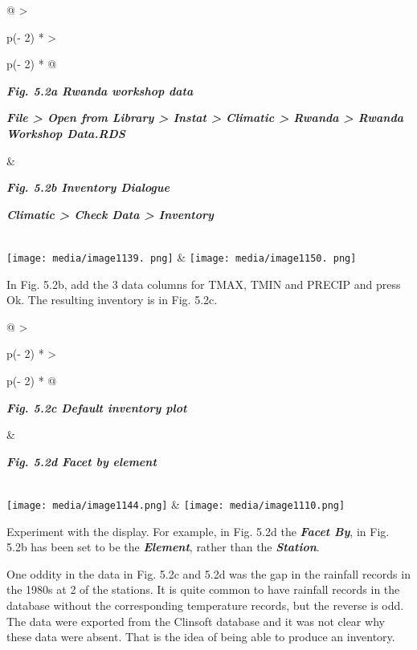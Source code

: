 \documentclass[
  letterpaper,
  DIV=11,
  numbers=noendperiod]{scrreprt}
\begin{document}
\begin{longtable}[]{@{}
  >{\raggedright\arraybackslash}p{(\columnwidth - 2\tabcolsep) * }
  >{\raggedright\arraybackslash}p{(\columnwidth - 2\tabcolsep) * }@{}}
\toprule\noalign{}
\begin{minipage}[b]{\linewidth}\raggedright
\textbf{\emph{Fig. 5.2a Rwanda workshop data}}

\textbf{\emph{File \textgreater{} Open from Library \textgreater{}
Instat \textgreater{} Climatic \textgreater{} Rwanda \textgreater{}
Rwanda Workshop Data.RDS}}
\end{minipage} & \begin{minipage}[b]{\linewidth}\raggedright
\textbf{\emph{Fig. 5.2b Inventory Dialogue}}

\textbf{\emph{Climatic \textgreater{} Check Data \textgreater{}
Inventory}}
\end{minipage} \\
\midrule\noalign{}
\endhead
\bottomrule\noalign{}
\endlastfoot
\texttt{[image: media/image1139. png]}
&
\texttt{[image: media/image1150. png]} \\
\end{longtable}

In Fig. 5.2b, add the 3 data columns for TMAX, TMIN and PRECIP and press
Ok. The resulting inventory is in Fig. 5.2c.

\begin{longtable}[]{@{}
  >{\raggedright\arraybackslash}p{(\columnwidth - 2\tabcolsep) * }
  >{\raggedright\arraybackslash}p{(\columnwidth - 2\tabcolsep) * }@{}}
\toprule\noalign{}
\begin{minipage}[b]{\linewidth}\raggedright
\textbf{\emph{Fig. 5.2c Default inventory plot}}
\end{minipage} & \begin{minipage}[b]{\linewidth}\raggedright
\textbf{\emph{Fig. 5.2d Facet by element}}
\end{minipage} \\
\midrule\noalign{}
\endhead
\bottomrule\noalign{}
\endlastfoot
\texttt{[image: media/image1144.png]}
&
\texttt{[image: media/image1110.png]} \\
\end{longtable}

Experiment with the display. For example, in Fig. 5.2d the
\textbf{\emph{Facet By}}, in Fig. 5.2b has been set to be the
\textbf{\emph{Element}}, rather than the \textbf{\emph{Station}}.

One oddity in the data in Fig. 5.2c and 5.2d was the gap in the rainfall
records in the 1980s at 2 of the stations. It is quite common to have
rainfall records in the database without the corresponding temperature
records, but the reverse is odd. The data were exported from the
Clinsoft database and it was not clear why these data were absent. That
is the idea of being able to produce an inventory.
\end{document}
